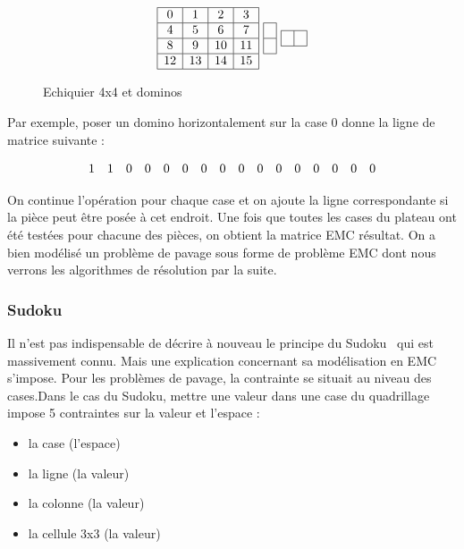\documentclass[a4paper]{article}
\begin{document}
\begin{figure}[h]
\centering
{}
\[
  \begin{array}{|c|c|c|c|}
		\hline
   	0 & 1 & 2 & 3 \\
		\hline
    4	& 5 & 6 & 7 \\
		\hline
   	8 & 9 & 10 & 11 \\
		\hline
   	12 & 13 & 14 & 15 \\
		\hline
\end{array}
	\textrm{ }
\begin{array}{ |c| }
	\hline
		\\
	\hline
    \\
	\hline
  \end{array}
	\textrm{ }
\begin{array}{ |c|c| }
	\hline
		& \\ 
	\hline
  \end{array}
\]
\caption{\label{chessboard4x4} Echiquier 4x4 et dominos}
\end{figure}

Par exemple, poser un domino horizontalement sur la case 0 donne la ligne
de matrice suivante : 

\[
  \begin{array}{ c c c c c c c c c c c c c c c c }
	1 & 1 & 0 & 0 & 0 & 0 & 0 & 0 & 0 & 0 & 0 & 0 & 0 & 0 & 0 & 0 
  \end{array}
\]

On continue l'opération pour chaque case et on ajoute la ligne correspondante
si la pièce peut être posée à cet endroit. 
Une fois que toutes les cases du plateau ont été testées pour chacune des pièces,
on obtient la matrice EMC résultat. On a bien modélisé un problème de pavage 
sous forme de problème EMC dont nous verrons les algorithmes de résolution par
la suite.

\subsubsection{Sudoku}

Il n'est pas indispensable de décrire à nouveau le principe du 
Sudoku~\cite{sudoku} qui est massivement connu. Mais une explication concernant
sa modélisation en EMC s'impose.
Pour les problèmes de pavage, la contrainte se situait au niveau des cases.Dans
le cas du Sudoku, mettre une valeur dans une case du quadrillage impose 
5 contraintes sur la valeur et l'espace : 
\begin{itemize}
\item la case (l'espace)
\item la ligne (la valeur)
\item la colonne (la valeur)
\item la cellule 3x3 (la valeur)
\end{itemize}
\end{document}
